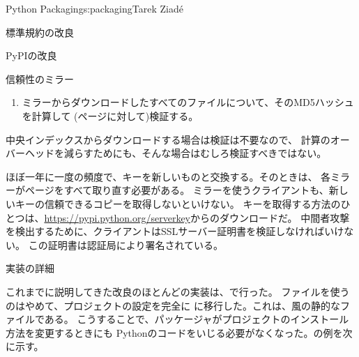 \begin{aosachapter}{Python Packaging}{s:packaging}{Tarek Ziad\'{e}}
\begin{aosasect1}{標準規約の改良}
\begin{aosasect2}{PyPIの改良}
\begin{aosasect3}{信頼性のミラー}
\begin{enumerate}
  \item ミラーからダウンロードしたすべてのファイルについて、そのMD5ハッシュを計算して
  (ページに対して)検証する。

\end{enumerate}

中央インデックスからダウンロードする場合は検証は不要なので、
計算のオーバーヘッドを減らすためにも、そんな場合はむしろ検証すべきではない。

ほぼ一年に一度の頻度で、キーを新しいものと交換する。そのときは、
各ミラーがページをすべて取り直す必要がある。
ミラーを使うクライアントも、新しいキーの信頼できるコピーを取得しないといけない。
キーを取得する方法のひとつは、\url{https://pypi.python.org/serverkey}からのダウンロードだ。
中間者攻撃を検出するために、クライアントはSSLサーバー証明書を検証しなければいけない。
この証明書は認証局により署名されている。

\end{aosasect3}

\end{aosasect2}

\end{aosasect1}

\begin{aosasect1}{実装の詳細}

これまでに説明してきた改良のほとんどの実装は、で行った。
ファイルを使うのはやめて、プロジェクトの設定を完全に
に移行した。これは、風の静的なファイルである。
こうすることで、パッケージャがプロジェクトのインストール方法を変更するときにも
Pythonのコードをいじる必要がなくなった。の例を次に示す。


\end{aosasect1}
\end{aosachapter}
